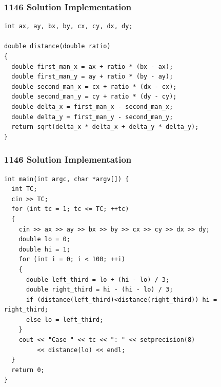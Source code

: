 \documentclass{beamer}
\newcommand{\uvalink}[2]{UVa Online Judge (http://uva.onlinejudge.org)
  problem number \href{#2}{\textcolor{blue}{#1}.}}
\newcommand{\hint}[1]{
\begin{bclogo}[arrondi=0.1, logo=\bclampe]{Hint}
#1
\end{bclogo}
}
\newcounter{exo}
\newcommand{\exo}{
  \addtocounter{exo}{1}
  Exercice \arabic{exo}
}
\begin{document}
\begin{frame}[containsverbatim]
\frametitle{1146 Solution Implementation}
\scriptsize

\begin{lstlisting}[mathescape]
int ax, ay, bx, by, cx, cy, dx, dy;

double distance(double ratio)
{
  double first_man_x = ax + ratio * (bx - ax);
  double first_man_y = ay + ratio * (by - ay);
  double second_man_x = cx + ratio * (dx - cx);
  double second_man_y = cy + ratio * (dy - cy);
  double delta_x = first_man_x - second_man_x;
  double delta_y = first_man_y - second_man_y;
  return sqrt(delta_x * delta_x + delta_y * delta_y);
}
\end{lstlisting}

\end{frame}

\begin{frame}[containsverbatim]
\frametitle{1146 Solution Implementation}
\scriptsize

\begin{lstlisting}[mathescape]
int main(int argc, char *argv[]) {
  int TC;
  cin >> TC;
  for (int tc = 1; tc <= TC; ++tc)
  {
    cin >> ax >> ay >> bx >> by >> cx >> cy >> dx >> dy;
    double lo = 0;
    double hi = 1;
    for (int i = 0; i < 100; ++i)
    {
      double left_third = lo + (hi - lo) / 3;
      double right_third = hi - (hi - lo) / 3;
      if (distance(left_third)<distance(right_third)) hi = right_third;
      else lo = left_third;
    }
    cout << "Case " << tc << ": " << setprecision(8)
         << distance(lo) << endl;
  }
  return 0;
}
\end{lstlisting}

\end{frame}

\fi


\ifanswers
\end{document}
